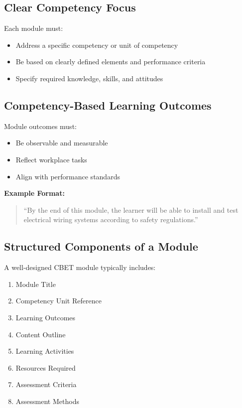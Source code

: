 \documentclass[12pt]{article}
\begin{document}
\subsection{Clear Competency Focus}

Each module must:

\begin{itemize}
    \item Address a specific competency or unit of competency
    \item Be based on clearly defined elements and performance criteria
    \item Specify required knowledge, skills, and attitudes
\end{itemize}

\subsection{Competency-Based Learning Outcomes}

Module outcomes must:

\begin{itemize}
    \item Be observable and measurable
    \item Reflect workplace tasks
    \item Align with performance standards
\end{itemize}

\textbf{Example Format:}

\begin{quote}
``By the end of this module, the learner will be able to install and test electrical wiring systems according to safety regulations.''
\end{quote}

\subsection{Structured Components of a Module}

A well-designed CBET module typically includes:

\begin{enumerate}
    \item Module Title
    \item Competency Unit Reference
    \item Learning Outcomes
    \item Content Outline
    \item Learning Activities
    \item Resources Required
    \item Assessment Criteria
    \item Assessment Methods
\end{enumerate}
\end{document}
